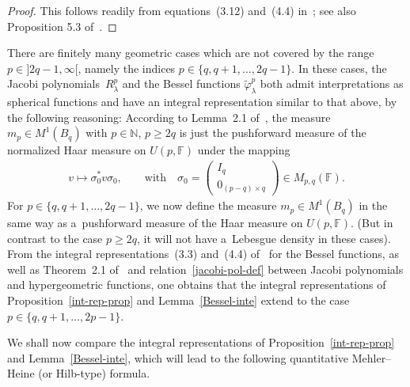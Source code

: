 \documentclass[11pt]{article}
\numberwithin{equation}{section}
\begin{document}
\begin{proof}
This follows readily from equations~(3.12) and~(4.4) in~\cite{R1}; see also Proposition 5.3 of~\cite{RV2}.
\end{proof}

\begin{Remark}
\label{group}
There are f\/initely many geometric cases which are not covered by the range $p\in{}]2q-1,\infty[$, namely the indices
$p\in\{q, q+1, \ldots, 2q-1\}$. In these cases, the Jacobi polyno\-mials~$R_\lambda^p $ and the Bessel functions
$\widetilde\varphi_\lambda^{p}$ both admit interpretations as spherical functions and have an integral representation
similar to that above, by the following reasoning: According to Lemma~2.1 of~\cite{R2}, the measure $m_p\in M^1(B_q)$
with $p\in \mathbb N$, $p\geq 2q$ is just the pushforward measure of the normalized Haar measure on $U(p,\mathbb F)$ under
the mapping
\begin{gather*}
v\mapsto \sigma_0^* v\sigma_0,
\qquad
\text{with}
\quad
\sigma_0=
\begin{pmatrix}
I_q
\\
0_{(p-q)\times q}
\end{pmatrix}
\in M_{p,q}(\mathbb F).
\end{gather*}
For $p\in \{q, q+1, \ldots, 2q-1\}$, we now def\/ine the measure $m_p\in M^1(B_q)$ in the same way as a~pushforward
measure of the Haar measure on $U(p, \mathbb F)$. (But in contrast to the case $p\geq 2q$, it will not have a~Lebesgue
density in these cases).
From the integral representa\-tions~(3.3) and~(4.4) of~\cite{R1} for the Bessel functions, as well as Theorem~2.1
of~\cite{RV2} and relation~\eqref{jacobi-pol-def} between Jacobi polynomials and hypergeometric functions, one obtains
that the integral representations of Proposition~\ref{int-rep-prop} and Lemma~\ref{Bessel-inte} extend
to the case $p\in\{q, q+1, \ldots, 2p-1\}$.
\end{Remark}

We shall now compare the integral representations of Proposition~\ref{int-rep-prop} and Lemma~\ref{Bessel-inte}, which
will lead to the following quantitative Mehler--Heine (or Hilb-type) formula.
\end{document}
